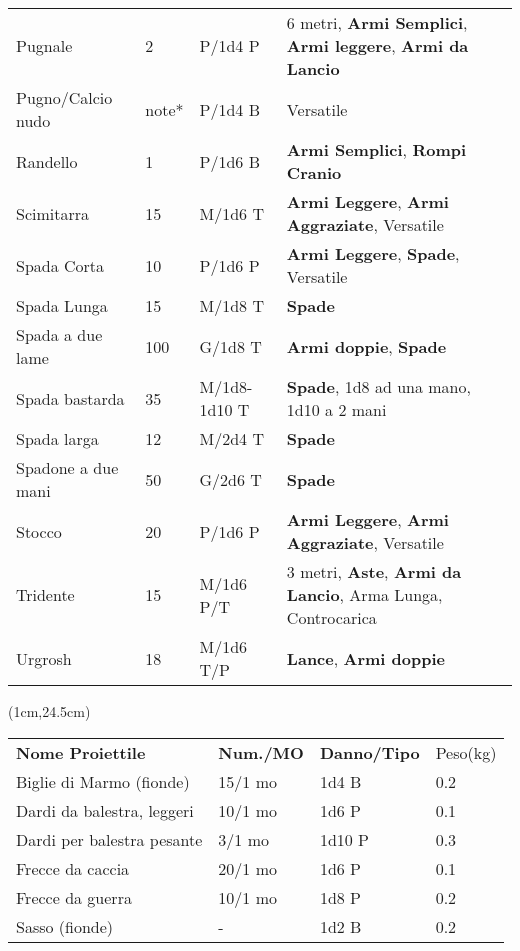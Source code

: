 \documentclass[a4paper,12 pt,openany]{book}
\begin{document}
\begin{textblock*}{19.5cm}
\begin{tabularx}{0.95\textwidth}{llll}
Pugnale& 2& P/1d4 P& 6 metri, \textbf{Armi Semplici}, \textbf{Armi leggere}, \textbf{Armi da Lancio}\\
Pugno/Calcio nudo& note*& P/1d4 B&Versatile\\
Randello& 1& P/1d6 B& \textbf{Armi Semplici}, \textbf{Rompi Cranio}\\
Scimitarra& 15 & M/1d6 T&\textbf{Armi Leggere}, \textbf{Armi Aggraziate}, Versatile\\
Spada Corta& 10 & P/1d6 P&\textbf{Armi Leggere}, \textbf{Spade}, Versatile\\
Spada Lunga& 15 & M/1d8 T&\textbf{Spade}\\
Spada a due lame& 100& G/1d8 T& \textbf{Armi doppie}, \textbf{Spade}\\
Spada bastarda& 35 & M/1d8-1d10 T&\textbf{Spade}, 1d8 ad una mano, 1d10 a 2 mani\\
Spada larga& 12 & M/2d4 T&\textbf{Spade}\\
Spadone a due mani& 50 & G/2d6 T&\textbf{Spade}\\
Stocco& 20 & P/1d6 P& \textbf{Armi Leggere}, \textbf{Armi Aggraziate}, Versatile\\
Tridente& 15 & M/1d6 P/T& 3 metri, \textbf{Aste}, \textbf{Armi da Lancio}, Arma Lunga, Controcarica\\
Urgrosh& 18 & M/1d6 T/P& \textbf{Lance}, \textbf{Armi doppie}\\
\end{tabularx}

\end{textblock*}

\begin{textblock*}{11.5cm}(1cm,24.5cm) %

\begin{tabular}{llll}
\textbf{Nome Proiettile}   & \textbf{Num./MO} & \textbf{Danno/Tipo} & Peso(kg) \\
Biglie di Marmo (fionde)   & 15/1 mo                    & 1d4 B               & 0.2      \\
Dardi da balestra, leggeri & 10/1 mo                    & 1d6 P               & 0.1      \\
Dardi per balestra pesante & 3/1 mo                     & 1d10 P              & 0.3      \\
Frecce da caccia           & 20/1 mo                    & 1d6 P               & 0.1      \\
Frecce da guerra           & 10/1 mo                    & 1d8 P               & 0.2      \\
Sasso (fionde)             & -                          & 1d2 B               & 0.2      \\
\end{tabular}

\end{textblock*}
\end{document}
